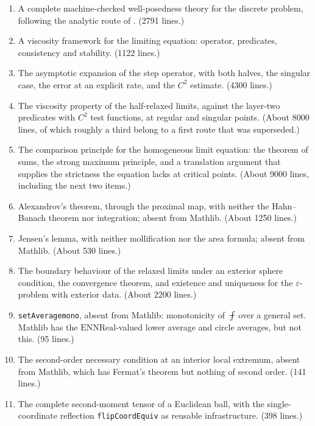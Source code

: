 \documentclass[11pt,reqno]{amsart}
\newcommand{\fint}{\mathop{\mathrlap{\,\rule[0.62ex]{0.62em}{0.5pt}}\int}}
\newcommand{\LEANREF}[1]{\texttt{\small\def\_{\textunderscore\allowbreak}#1}}
\newcommand{\eps}{\varepsilon}
\newcommand{\avgint}{\fint}
\theoremstyle{plain}
\theoremstyle{definition}
\begin{document}
\begin{enumerate}
  \item A complete machine-checked well-posedness theory for the discrete
        problem, following the analytic route of \cite{LPS14}. (2791 lines.)
  \item A viscosity framework for the limiting equation: operator, predicates,
        consistency and stability. (1122 lines.)
  \item The asymptotic expansion of the step operator, with both halves, the
        singular case, the error at an explicit rate, and the $C^2$ estimate.
        (4300 lines.)
  \item The viscosity property of the half-relaxed limits, against the
        layer-two predicates with $C^2$ test functions, at regular and
        singular points. (About 8000 lines, of which roughly a third belong to
        a first route that was superseded.)
  \item The comparison principle for the homogeneous limit equation: the
        theorem of sums, the strong maximum principle, and a translation
        argument that supplies the strictness the equation lacks at critical
        points. (About 9000 lines, including the next two items.)
  \item Alexandrov's theorem, through the proximal map, with neither the
        Hahn--Banach theorem nor integration; absent from Mathlib.
        (About 1250 lines.)
  \item Jensen's lemma, with neither mollification nor the area formula;
        absent from Mathlib. (About 530 lines.)
  \item The boundary behaviour of the relaxed limits under an exterior sphere
        condition, the convergence theorem, and existence and uniqueness for
        the $\eps$-problem with exterior data. (About 2200 lines.)
  \item \LEANREF{setAverage\_mono}, absent from Mathlib: monotonicity of
        $\avgint$ over a general set. Mathlib has the $\mathrm{ENNReal}$-valued
        lower average and circle averages, but not this. (95 lines.)
  \item The second-order necessary condition at an interior local extremum,
        absent from Mathlib, which has Fermat's theorem but nothing of second
        order. (141 lines.)
  \item The complete second-moment tensor of a Euclidean ball, with the
        single-coordinate reflection \LEANREF{flipCoordEquiv} as reusable
        infrastructure. (398 lines.)

\end{enumerate}
\end{document}
